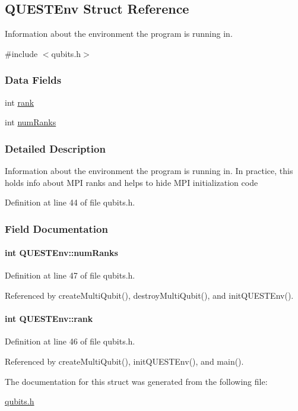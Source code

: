 \hypertarget{structQUESTEnv}{
\subsection{QUESTEnv Struct Reference}
\label{structQUESTEnv}
}


Information about the environment the program is running in.  


{\ttfamily \#include $<$qubits.h$>$}\subsubsection*{Data Fields}
\begin{DoxyCompactItemize}
\item 
int \hyperlink{structQUESTEnv_a1bdb6d425a2ce6a468f93929c0b26d73}{rank}
\item 
int \hyperlink{structQUESTEnv_ab9d9ce82e2d5f1b39aa9efc3accb3742}{numRanks}
\end{DoxyCompactItemize}


\subsubsection{Detailed Description}
Information about the environment the program is running in. In practice, this holds info about MPI ranks and helps to hide MPI initialization code 

Definition at line 44 of file qubits.h.

\subsubsection{Field Documentation}
\hypertarget{structQUESTEnv_ab9d9ce82e2d5f1b39aa9efc3accb3742}{
\paragraph[{numRanks}]{\setlength{\rightskip}{0pt plus 5cm}int {\bf QUESTEnv::numRanks}}\hfill}
\label{structQUESTEnv_ab9d9ce82e2d5f1b39aa9efc3accb3742}


Definition at line 47 of file qubits.h.

Referenced by createMultiQubit(), destroyMultiQubit(), and initQUESTEnv().\hypertarget{structQUESTEnv_a1bdb6d425a2ce6a468f93929c0b26d73}{
\paragraph[{rank}]{\setlength{\rightskip}{0pt plus 5cm}int {\bf QUESTEnv::rank}}\hfill}
\label{structQUESTEnv_a1bdb6d425a2ce6a468f93929c0b26d73}


Definition at line 46 of file qubits.h.

Referenced by createMultiQubit(), initQUESTEnv(), and main().

The documentation for this struct was generated from the following file:\begin{DoxyCompactItemize}
\item 
\hyperlink{qubits_8h}{qubits.h}\end{DoxyCompactItemize}
